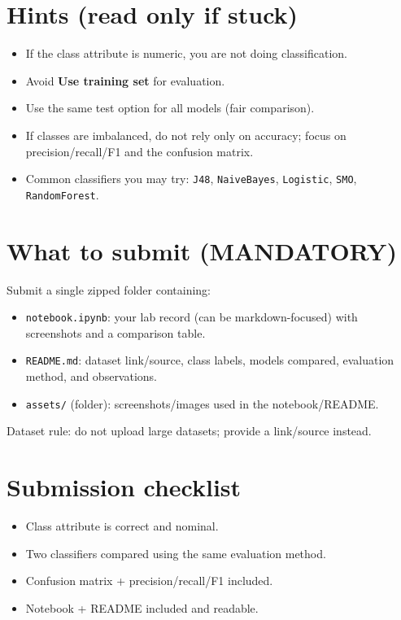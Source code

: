\documentclass[11pt]{article}
\begin{document}
\section{Hints (read only if stuck)}
\begin{itemize}[leftmargin=*]
  \item If the class attribute is numeric, you are not doing classification.
  \item Avoid \textbf{Use training set} for evaluation.
  \item Use the same test option for all models (fair comparison).
  \item If classes are imbalanced, do not rely only on accuracy; focus on precision/recall/F1 and the confusion matrix.
  \item Common classifiers you may try: \texttt{J48}, \texttt{NaiveBayes}, \texttt{Logistic}, \texttt{SMO}, \texttt{RandomForest}.
\end{itemize}

\section{What to submit (MANDATORY)}
Submit a single zipped folder containing:
\begin{itemize}[leftmargin=*]
  \item \texttt{notebook.ipynb}: your lab record (can be markdown-focused) with screenshots and a comparison table.
  \item \texttt{README.md}: dataset link/source, class labels, models compared, evaluation method, and observations.
  \item \texttt{assets/} (folder): screenshots/images used in the notebook/README.
\end{itemize}
Dataset rule: do not upload large datasets; provide a link/source instead.

\section{Submission checklist}
\begin{itemize}[leftmargin=*]
  \item Class attribute is correct and nominal.
  \item Two classifiers compared using the same evaluation method.
  \item Confusion matrix + precision/recall/F1 included.
  \item Notebook + README included and readable.
\end{itemize}
\end{document}
